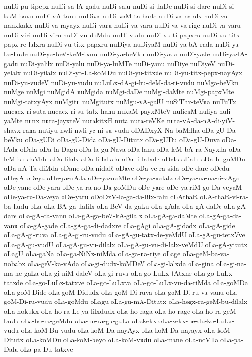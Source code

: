 {nuDi-pu-tipepx
nuDi-sa-lA-gadu
nuDi-salu
nuDi-si-daDe
nuDi-si-dare
nuDi-si-koM-bavu
nuDi-vA-tanu
nuDiva
nuDi-vaM-ta-hade
nuDi-va-nalalx
nuDi-va-nanxkakx
nuDi-va-rayayx
nuDi-varu
nuDi-va-vara
nuDi-va-va-rige
nuDi-va-varu
nuDi-viri
nuDi-viro
nuDi-vu-doMdu
nuDi-vudu
nuDi-vu-ti-papxru
nuDi-vu-titx-papx-re-lalxra
nuDi-vu-titx-papxru
nuDiya
nuDiyaM
nuDi-ya-bA-rada
nuDi-ya-ba-hude
nuDi-ya-beV-keM-baru
nuDi-ya-beVku
nuDi-yada
nuDi-yade
nuDi-ya-lA-gadu
nuDi-yalilx
nuDi-yalu
nuDi-ya-luMTe
nuDi-yanu
nuDiye
nuDiyeV
nuDi-yelalx
nuDi-yilalx
nuDi-yo-La-koMDu
nuDi-yu-titxde
nuDi-yu-titx-pepx-nayAyx
nuDi-yu-vudeV
nuDi-yu-vudu
nuLuLx-dA-gi-hu-deM-da-ri-vudu
nuMga-beVku
nuMge
nuMgi
nuMgidA
nuMgida
nuMgi-daDe
nuMgi-daMte
nuMgi-papxMte
nuMgi-tatxyAyx
nuMgitu
nuMgitutx
nuMgu-vA-galU
nuSiThx-teVna
nuTuTx
nucacx-ri-suta
nucacx-ri-su-tatx-hanu
nukaM-payxMteV
nulicaM
nuliya
nuli-yaMte
nunx
nura-jayxteV
nurakitxH
nuta
nuta-reVKe
nuta-vA-da-nA-di-yiV-shavx-rana
nutiyu
nwli
nwli-ye-ni-su-vudu
oDADxyX-Na-baMdha
oDa-gU-Da-beVku
oDa-gUDi
oDa-gU-Dida
oDa-gU-Ditutx
oDa-gUDu
oDa-gU-Duva
oDa-lAda
oDala
oDa-la-Dagu
oDa-la-gu-Nava
oDa-lanu
oDa-leM-bA-ra-Nayxda
oDa-leM-bu-doMdu
oDa-lilalx
oDa-li-lalxda
oDa-li-lalxde
oDalo
oDalu
oDa-lu-goMDu
oDa-nA-Ta-diMda
oDane
oDa-nidaR
oDave
oDa-ve-ra-sida
oDe-dare
oDedu
oDeyA
oDeya
oDe-ya-nAda
oDe-ya-naMte
oDe-ya-nalalx
oDe-ya-na-na-ri-vAga
oDe-yane
oDe-yara
oDe-ya-ra-no-Da-goMDu
oDe-yare
oDe-ya-riM-go-Da-veyaM
oDe-ya-ro-Da-veya
oDe-yaru
oDoDxV-la-ga-da-lilx-ralu
oLAthaR
oLA-thaR-vi-ra-ba-hudu
oLa
oLa-BA-ga-dalilx
oLa-BeV-da-gaLu
oLa-gAda
oLa-gA-daDe
oLa-gA-dare
oLa-gA-da-vanu
oLa-gA-ga-beV-kA-gilalx
oLa-gA-ga-daMte
oLa-gA-ga-da-vanu
oLa-gA-gade
oLa-gA-ga-di-dadxre
oLa-gAgi
oLa-gA-gidadx
oLa-gA-gide
oLa-gA-gi-ruva
oLa-gA-gi-ru-vudu
oLa-gA-gu-tatx-de-yeMdU
oLa-gA-gu-tetxVve
oLa-gA-gu-vudU
oLa-gA-gu-vu-dilalx
oLa-gA-gu-vu-di-lalx-veMdU
oLa-gA-yitutx
oLagU
oLa-gaNa
oLa-ga-NiNx-niMda
oLa-ga-na-riye
oLage
oLa-geM-ba-va-nobabx
oLa-geV-ka-vAda
oLa-gi-dudx-koMDeV
oLa-gi-lalxda
oLa-gina
oLa-gi-na-ma-ne-gaLa
oLa-gi-niM-daleV
oLa-gi-ruva
oLa-go-LuLx-tAtxne
oLa-go-LuLx-tatxde
oLa-go-LuLx-tatxve
oLa-go-LuLxva
oLa-go-LuLx-vu-da-riMda
oLa-goMDa
oLa-goM-Dide
oLa-goM-Didudx
oLa-goM-Di-ruva
oLa-goM-Di-ru-va-vanu
oLa-goM-Di-ru-vudu
oLa-goMdu
oLagu
oLa-gu-mA-Ditutx
oLa-hegx-ra-geM-bu-dilalx
oLa-hokukx
oLa-ho-ra-Le-ya-lilxdudx
oLa-ho-raga
oLa-ho-rage
oLa-ho-ra-geM-budu
oLa-ho-ra-geMdu
oLa-ho-ra-gu-gaLa
oLakekx
oLa-kekx-Le-du-ko-LuLx-vudu
oLa-koM-Bu-vudu
oLa-koM-Da-nayAyx
oLa-koM-Da-nayayx
oLa-koM-Ditutx
oLa-koMDu
oLa-koM-beyo
oLa-koM-vudu
oLa-mane
oLa-noVTa
oLa-pa-Dalu
oLa-pa-Du-tatxve
}
